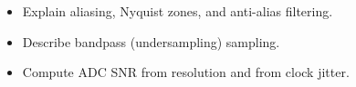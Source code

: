\begin{objectives}
\begin{itemize}[leftmargin=1.4em,itemsep=2pt]
\item Explain aliasing, Nyquist zones, and anti-alias filtering.
\item Describe bandpass (undersampling) sampling.
\item Compute ADC SNR from resolution and from clock jitter.
\end{itemize}
\end{objectives}
